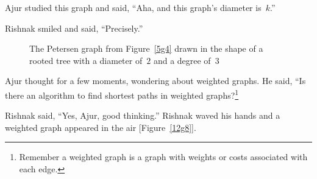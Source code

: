 Ajur studied this graph and said, ``Aha, and this graph's diameter is~$k$.''

Rishnak smiled and said, ``Precisely.''

\begin{figure}
\begin{center}
\caption{The Petersen graph from Figure~\ref{5g4} drawn in the shape of a rooted tree with a diameter of~$2$ and a degree of~$3$}\label{12g7}
\end{center}
\end{figure}

Ajur thought for a few moments, wondering about weighted graphs.  He said, ``Is there an algorithm to find shortest paths in weighted graphs?\footnote{Remember a weighted graph is a graph with weights or costs associated with each edge.}

Rishnak said, ``Yes, Ajur, good thinking.''  Rishnak waved his hands and a weighted graph appeared in the air [Figure~\ref{12g8}].

